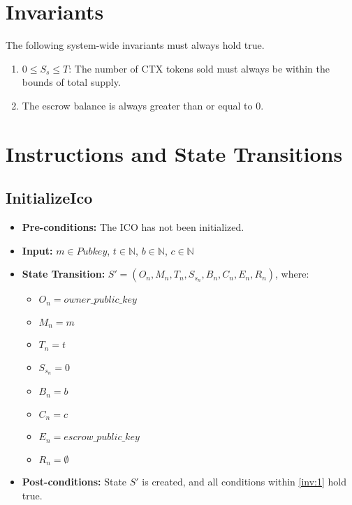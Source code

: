 \documentclass{article}
\begin{document}
\section{Invariants}
The following system-wide invariants must always hold true.
\begin{enumerate}
    \item \label{inv:1}  $0 \leq S_s \leq T$: The number of CTX tokens sold must always be within the bounds of total supply.
    \item \label{inv:2} The escrow balance is always greater than or equal to 0.
\end{enumerate}


\section{Instructions and State Transitions}

\subsection{InitializeIco}
\begin{itemize}
    \item \textbf{Pre-conditions:} The ICO has not been initialized.
    \item \textbf{Input:}  $m \in Pubkey$, $t \in \mathbb{N}$, $b \in \mathbb{N}$, $c \in \mathbb{N}$
    \item \textbf{State Transition:}
            $S' = (O_n, M_n, T_n, S_{s_n}, B_n, C_n, E_n, R_n)$, where:
            \begin{itemize}
                 \item $O_n = owner\_public\_key$
                 \item $M_n = m$
                 \item $T_n = t$
                 \item $S_{s_n} = 0$
                 \item $B_n = b$
                 \item $C_n = c$
                 \item $E_n = escrow\_public\_key$
                \item $R_n = \emptyset$
            \end{itemize}

    \item \textbf{Post-conditions:} State $S'$ is created, and all conditions within \ref{inv:1} hold true.
\end{itemize}
\end{document}
